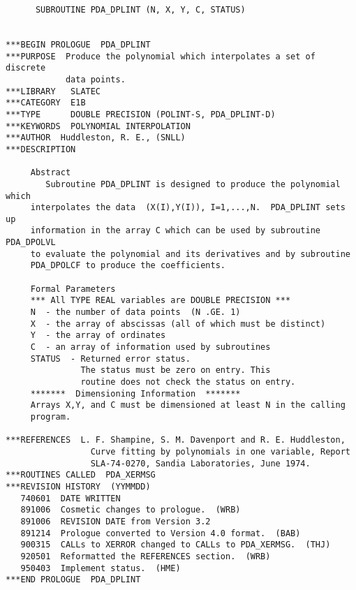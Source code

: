 \begin{verbatim}
      SUBROUTINE PDA_DPLINT (N, X, Y, C, STATUS)


***BEGIN PROLOGUE  PDA_DPLINT
***PURPOSE  Produce the polynomial which interpolates a set of discrete
            data points.
***LIBRARY   SLATEC
***CATEGORY  E1B
***TYPE      DOUBLE PRECISION (POLINT-S, PDA_DPLINT-D)
***KEYWORDS  POLYNOMIAL INTERPOLATION
***AUTHOR  Huddleston, R. E., (SNLL)
***DESCRIPTION

     Abstract
        Subroutine PDA_DPLINT is designed to produce the polynomial which
     interpolates the data  (X(I),Y(I)), I=1,...,N.  PDA_DPLINT sets up
     information in the array C which can be used by subroutine PDA_DPOLVL
     to evaluate the polynomial and its derivatives and by subroutine
     PDA_DPOLCF to produce the coefficients.

     Formal Parameters
     *** All TYPE REAL variables are DOUBLE PRECISION ***
     N  - the number of data points  (N .GE. 1)
     X  - the array of abscissas (all of which must be distinct)
     Y  - the array of ordinates
     C  - an array of information used by subroutines
     STATUS  - Returned error status.
               The status must be zero on entry. This
               routine does not check the status on entry.
     *******  Dimensioning Information  *******
     Arrays X,Y, and C must be dimensioned at least N in the calling
     program.

***REFERENCES  L. F. Shampine, S. M. Davenport and R. E. Huddleston,
                 Curve fitting by polynomials in one variable, Report
                 SLA-74-0270, Sandia Laboratories, June 1974.
***ROUTINES CALLED  PDA_XERMSG
***REVISION HISTORY  (YYMMDD)
   740601  DATE WRITTEN
   891006  Cosmetic changes to prologue.  (WRB)
   891006  REVISION DATE from Version 3.2
   891214  Prologue converted to Version 4.0 format.  (BAB)
   900315  CALLs to XERROR changed to CALLs to PDA_XERMSG.  (THJ)
   920501  Reformatted the REFERENCES section.  (WRB)
   950403  Implement status.  (HME)
***END PROLOGUE  PDA_DPLINT
\end{verbatim}


\newpage %

